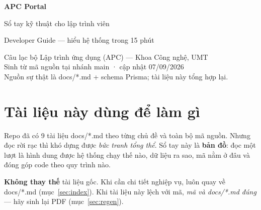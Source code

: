\documentclass[11pt]{article}
\newcommand{\code}[1]{{\ttfamily #1}}
\begin{document}
\begin{titlepage}
\centering
\vspace*{2.2cm}
{\sffamily\Huge\bfseries\color{apcblue} APC Portal\par}
\vspace{6pt}
{\sffamily\LARGE\color{apcred} Sổ tay kỹ thuật cho lập trình viên\par}
\vspace{4pt}
{\sffamily\large\color{inkgray} Developer Guide — hiểu hệ thống trong 15 phút\par}
\vspace{2cm}
\vfill
{\sffamily\color{inkgray}
Câu lạc bộ Lập trình ứng dụng (APC) — Khoa Công nghệ, UMT\\[2pt]
Sinh từ mã nguồn tại nhánh \code{main} · cập nhật 07/09/2026\\
Nguồn sự thật là \code{docs/*.md} + schema Prisma; tài liệu này tổng hợp lại.\par}
\end{titlepage}

\tableofcontents
\thispagestyle{fancy}
\clearpage

\section{Tài liệu này dùng để làm gì}
Repo đã có 9 tài liệu \code{docs/*.md} theo từng chủ đề và toàn bộ mã nguồn. Nhưng đọc rời rạc thì
khó dựng được \emph{bức tranh tổng thể}. Sổ tay này là \textbf{bản đồ}: đọc một lượt là hình dung
được hệ thống chạy thế nào, dữ liệu ra sao, mã nằm ở đâu và đóng góp code theo quy trình nào.

\textbf{Không thay thế} tài liệu gốc. Khi cần chi tiết nghiệp vụ, luôn quay về \code{docs/*.md}
(mục~\ref{sec:index}). Khi tài liệu này lệch với mã, \emph{mã và \code{docs/*.md} đúng} — hãy sinh lại
PDF (mục~\ref{sec:regen}).
\end{document}
